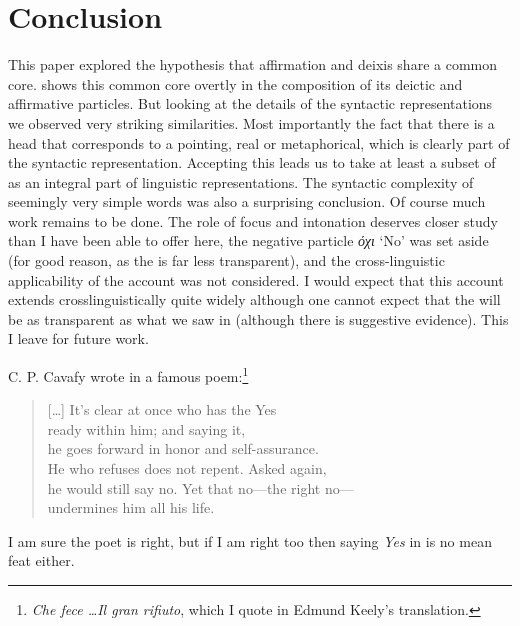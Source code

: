 \documentclass[output=paper]{LSP/langsci}
\begin{document}
\section{Conclusion}
\label{sec6}
This paper explored the hypothesis that affirmation and deixis share a common core.   shows this common core overtly in the  composition of its deictic and affirmative particles.  But looking at the details of the syntactic representations we observed very striking similarities.  Most importantly the fact that there is a head that corresponds to a pointing, real or metaphorical, which is clearly part of the syntactic representation.  Accepting this leads us to take at least a subset of  as an integral part of linguistic representations.  The syntactic complexity of seemingly very simple words was also a surprising conclusion.  Of course much work remains to be done.  The role of focus and intonation deserves closer study than I have been able to offer here, the negative particle \textit{όχι} `No' was set aside (for good reason, as the  is far less transparent), and the cross-linguistic applicability of the account was not considered.  I would expect that this account extends crosslinguistically quite widely although one cannot expect that the  will be as transparent as what we saw in  (although there is suggestive evidence).  This I leave for future work. 

C. P. Cavafy wrote in a famous poem:\footnote{\textit{Che fece \ldots Il gran rifiuto}, which I quote in Edmund Keely's translation.} 


\begin{quote}
[\ldots] It’s clear at once who has the Yes \\
ready within him; and saying it,\\
 he goes forward in honor and self-assurance.  \\
He who refuses does not repent. Asked again,\\
he would still say no. Yet that no—the right no—\\
undermines him all his life. 
\end{quote}

I am sure the poet is right, but if I am right too then saying \textit{Yes} in  is no mean feat either.
\end{document}

